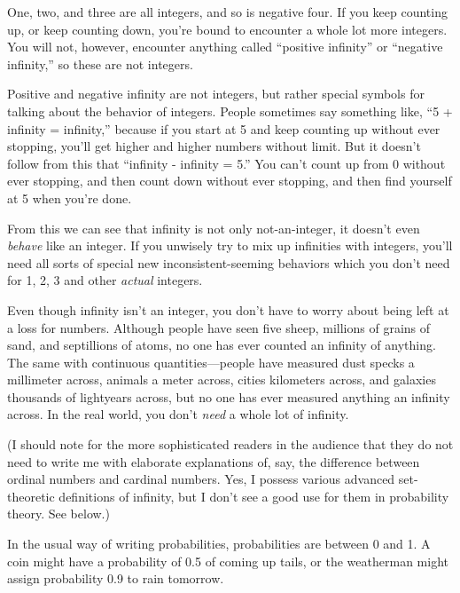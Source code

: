 \myendsectiontext


{
 One, two, and three are all integers, and so is negative four. If
you keep counting up, or keep counting down, you're
bound to encounter a whole lot more integers. You will not, however,
encounter anything called ``positive
infinity'' or ``negative
infinity,'' so these are not integers. }

{
 Positive and negative infinity are not integers, but rather
special symbols for talking about the behavior of integers. People
sometimes say something like, ``5 + infinity =
infinity,'' because if you start at 5 and keep
counting up without ever stopping, you'll get higher
and higher numbers without limit. But it doesn't follow
from this that ``infinity - infinity =
5.'' You can't count up from 0
without ever stopping, and then count down without ever stopping, and
then find yourself at 5 when you're done.}

{
 From this we can see that infinity is not only not-an-integer, it
doesn't even \textit{behave} like an integer. If you
unwisely try to mix up infinities with integers, you'll
need all sorts of special new inconsistent-seeming behaviors which you
don't need for 1, 2, 3 and other \textit{actual}
integers.}

{
 Even though infinity isn't an integer, you
don't have to worry about being left at a loss for
numbers. Although people have seen five sheep, millions of grains of
sand, and septillions of atoms, no one has ever counted an infinity of
anything. The same with continuous quantities---people have measured
dust specks a millimeter across, animals a meter across, cities
kilometers across, and galaxies thousands of lightyears across, but no
one has ever measured anything an infinity across. In the real world,
you don't \textit{need} a whole lot of infinity.}

{
 (I should note for the more sophisticated readers in the audience
that they do not need to write me with elaborate explanations of, say,
the difference between ordinal numbers and cardinal numbers. Yes, I
possess various advanced set-theoretic definitions of infinity, but I
don't see a good use for them in probability theory.
See below.)}

{
 In the usual way of writing probabilities, probabilities are
between 0 and 1. A coin might have a probability of 0.5 of coming up
tails, or the weatherman might assign probability 0.9 to rain
tomorrow.}

